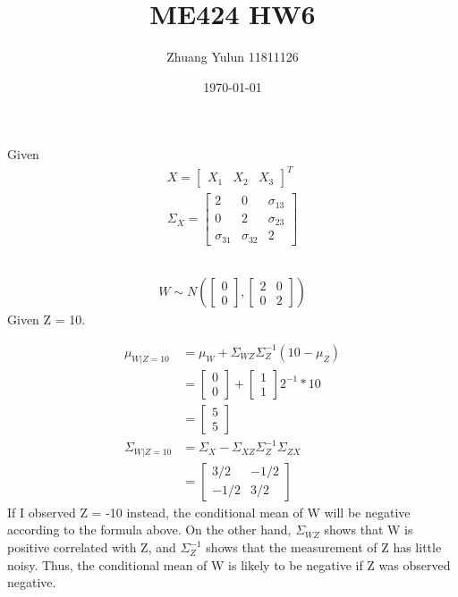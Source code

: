 \documentclass{article}
\title{ME424 HW6}
\author{Zhuang Yulun 11811126}
\date{\today}
\begin{document}
\maketitle

\section{}
Given
\begin{align*}
    X =
    \begin{bmatrix}
        X_1&X_2&X_3
    \end{bmatrix}^T\\
    \Sigma_X = 
    \begin{bmatrix}
        2&0&\sigma_{13}\\
        0&2&\sigma_{23}\\
        \sigma_{31}&\sigma_{32}&2
    \end{bmatrix}
\end{align*}
\subsection{}
\begin{align*}
    W\sim N(
    \begin{bmatrix}
        0\\0
    \end{bmatrix}
    ,
    \begin{bmatrix}
        2&0\\0&2
    \end{bmatrix}
    )    
\end{align*}
Given Z = 10.

\begin{align*}
    \mu_{W|Z=10} &= \mu_W+\Sigma_{WZ}\Sigma_Z^{-1}(10-\mu_Z)\\
    &=
    \begin{bmatrix}
        0\\0
    \end{bmatrix}
    +
    \begin{bmatrix}
        1\\1
    \end{bmatrix}
    2^{-1}*10\\
    &=
    \begin{bmatrix}
        5\\5
    \end{bmatrix}\\
    \Sigma_{W|Z=10}&=\Sigma_X-\Sigma_{XZ}\Sigma_Z^{-1}\Sigma_{ZX}\\
    &=
    \begin{bmatrix}
        3/2&-1/2\\
        -1/2&3/2
    \end{bmatrix}
\end{align*}
If I observed Z = -10 instead, the conditional mean of W will be negative according to the formula above.
On the other hand, $\Sigma_{WZ}$ shows that W is positive correlated with Z, and $\Sigma^{-1}_Z$ shows that the measurement of Z has little noisy.
Thus, the conditional mean of W is likely to be negative if Z was observed negative.
\end{document}
